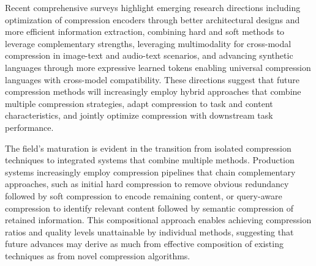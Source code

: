 Recent comprehensive surveys \citep{li2025prompt} highlight emerging research directions including optimization of compression encoders through better architectural designs and more efficient information extraction, combining hard and soft methods to leverage complementary strengths, leveraging multimodality for cross-modal compression in image-text and audio-text scenarios, and advancing synthetic languages through more expressive learned tokens enabling universal compression languages with cross-model compatibility. These directions suggest that future compression methods will increasingly employ hybrid approaches that combine multiple compression strategies, adapt compression to task and content characteristics, and jointly optimize compression with downstream task performance.

The field's maturation is evident in the transition from isolated compression techniques to integrated systems that combine multiple methods. Production systems increasingly employ compression pipelines that chain complementary approaches, such as initial hard compression to remove obvious redundancy followed by soft compression to encode remaining content, or query-aware compression to identify relevant content followed by semantic compression of retained information. This compositional approach enables achieving compression ratios and quality levels unattainable by individual methods, suggesting that future advances may derive as much from effective composition of existing techniques as from novel compression algorithms.
